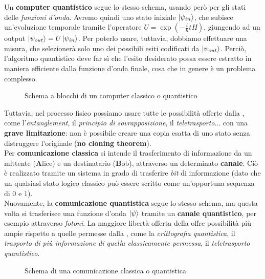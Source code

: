 \documentclass[../../InformazioneQuantistica.tex]{subfiles}
\begin{document}
Un \textbf{computer quantistico}  segue lo stesso schema, usando però per gli stati delle \textit{funzioni d'onda}. Avremo quindi uno stato iniziale $\Ket{\psi_{in}}$, che subisce un'evoluzione temporale tramite l'operatore $U=\exp\left(-\frac{i}{\hbar}tH\right)$, giungendo ad un output $\Ket{\psi_{out}}=U\Ket{\psi_{in}}$. Per poterlo usare, tuttavia, dobbiamo effettuare una misura, che selezionerà solo uno dei possibili esiti codificati da $\Ket{\psi_{out}}$. Perciò, l'algoritmo quantistico deve far sì che l'esito desiderato possa essere estratto in maniera efficiente dalla funzione d'onda finale, cosa che in genere è un problema complesso.

\begin{figure}[H]
\centering

\caption{Schema a blocchi di un computer classico o quantistico\label{fig:computer-classico-quantistico}}
\end{figure}

Tuttavia, nel processo fisico possiamo usare tutte le possibilità offerte dalla \MQ, come l'\textit{entanglement}, il \textit{principio di sovrapposizione}, il \textit{teletrasporto}... con una \textbf{grave limitazione}: non è possibile creare una copia esatta di uno stato senza distruggere l'originale (\textbf{no cloning theorem}).\\


Per \textbf{comunicazione classica} si intende il trasferimento di informazione da un mittente (\textbf{A}lice) e un destinatario (\textbf{B}ob), attraverso un determinato \textbf{canale}. Ciò è realizzato tramite un sistema in grado di trasferire \textit{bit} di informazione (dato che un qualsiasi stato logico classico può essere scritto come un'opportuna sequenza di $0$ e $1$).\\

Nuovamente, la \textbf{comunicazione quantistica} segue lo stesso schema, ma questa volta si trasferisce una funzione d'onda $\Ket{\psi}$ tramite un \textbf{canale quantistico}, per esempio attraverso \textit{fotoni}. La maggiore libertà offerta della \MQ offre possibilità più ampie rispetto a quelle permesse dalla \MC, come la \textit{crittografia quantistica}, il \textit{trasporto di più informazione di quella classicamente permessa}, il \textit{teletrasporto quantistico}.

\begin{figure}[H]
\centering

\caption{Schema di una comunicazione classica o quantistica\label{fig:comunicazione-classica-quantistica}}
\end{figure}
\end{document}
